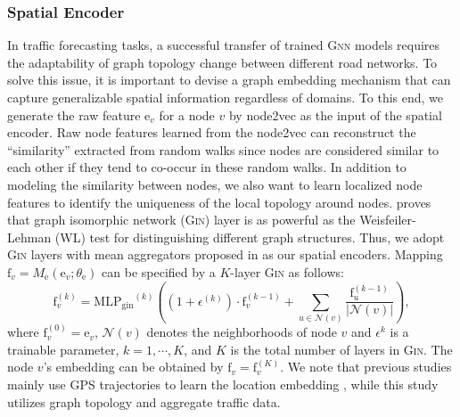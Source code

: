 \documentclass[sigconf]{acmart}
\theoremstyle{definition}
\begin{document}
\subsubsection{Spatial Encoder}
In traffic forecasting tasks, a successful transfer of trained \textsc{Gnn} models requires the adaptability of graph topology change between different road networks. To solve this issue, it is important to devise a graph embedding mechanism that can capture generalizable spatial information regardless of domains. To this end, we generate the raw feature $\mathrm{e}_v$ for a node $v$ by node2vec \cite{grover2016node2vec} as the input of the spatial encoder. Raw node features learned from the node2vec can reconstruct the ``similarity'' extracted from random walks since nodes are considered similar to each other if they tend to co-occur in these random walks. 
In addition to modeling the similarity between nodes, we also want to learn localized node features to identify the uniqueness of the local topology around nodes. 
\cite{xu2018powerful} proves that graph isomorphic network (\textsc{Gin}) layer is as powerful as the Weisfeiler-Lehman (WL) test \cite{weisfeiler1968reduction} for distinguishing different graph structures. Thus, we adopt \textsc{Gin} layers with mean aggregators proposed in \cite{xu2018powerful} as our spatial encoders. Mapping $\mathrm{f}_v={M}_\mathrm{e}\left(\mathrm{e}_v ; \theta_\mathrm{e}\right)$ can be specified by a $K$-layer \textsc{Gin} as follows:
\begin{equation}\label{eq5}
    \mathrm{f}_{v}^{(k)}=\mathrm{{MLP}_{gin}}^{(k)}\left(\left(1+\epsilon^{(k)}\right) \cdot \mathrm{f}_{v}^{(k-1)}+\sum_{u \in \mathcal{N}(v)} \frac{\mathrm{f}_{u}^{(k-1)}}{|\mathcal{N}(v)|} \right),
\end{equation}where $\mathrm{f}_{v}^{(0)}=\mathrm{e}_{v}$, $\mathcal{N}(v)$ denotes the neighborhoods of node $v$ and $\epsilon^{k}$ is a trainable parameter, $k=1, \cdots, K$, and $K$ is the total number of layers in \textsc{Gin}. The node $v$'s embedding can be obtained by $\mathrm{f}_v=\mathrm{f}_v^{(K)}$. We note that previous studies mainly use GPS trajectories to learn the location embedding \cite{wu2020learning, chen2021robust}, while this study utilizes graph topology and aggregate traffic data.
\end{document}
